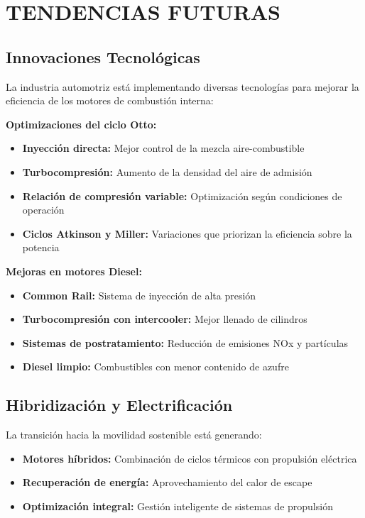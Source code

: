 \documentclass{article}
\begin{document}
\vspace{5mm}

\section*{TENDENCIAS FUTURAS}

\subsection*{Innovaciones Tecnológicas}

La industria automotriz está implementando diversas tecnologías para mejorar la eficiencia de los motores de combustión interna:

\textbf{Optimizaciones del ciclo Otto:}
\begin{itemize}
    \item \textbf{Inyección directa:} Mejor control de la mezcla aire-combustible
    \item \textbf{Turbocompresión:} Aumento de la densidad del aire de admisión
    \item \textbf{Relación de compresión variable:} Optimización según condiciones de operación
    \item \textbf{Ciclos Atkinson y Miller:} Variaciones que priorizan la eficiencia sobre la potencia
\end{itemize}

\textbf{Mejoras en motores Diesel:}
\begin{itemize}
    \item \textbf{Common Rail:} Sistema de inyección de alta presión
    \item \textbf{Turbocompresión con intercooler:} Mejor llenado de cilindros
    \item \textbf{Sistemas de postratamiento:} Reducción de emisiones NOx y partículas
    \item \textbf{Diesel limpio:} Combustibles con menor contenido de azufre
\end{itemize}

\subsection*{Hibridización y Electrificación}

La transición hacia la movilidad sostenible está generando:
\begin{itemize}
    \item \textbf{Motores híbridos:} Combinación de ciclos térmicos con propulsión eléctrica
    \item \textbf{Recuperación de energía:} Aprovechamiento del calor de escape
    \item \textbf{Optimización integral:} Gestión inteligente de sistemas de propulsión
\end{itemize}
\end{document}
